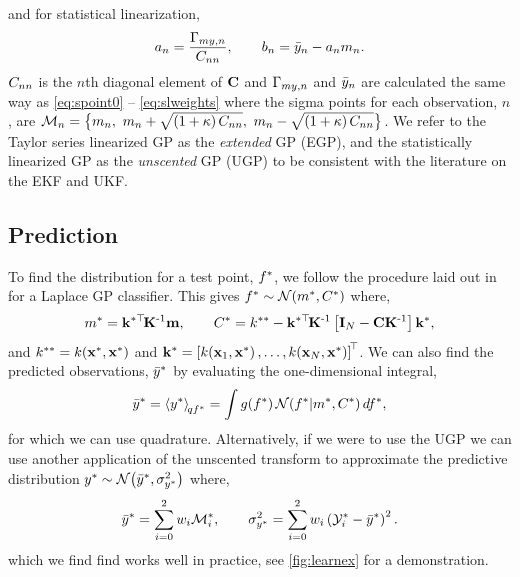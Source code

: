 \documentclass{article} %
\begin{document}
and for statistical linearization,
\begin{equation}
    a_n = \frac{\Gamma_{my,n}}{C_{nn}},
    \qquad
    b_n = \bar{y}_n - a_nm_n.
\end{equation}
$C_{nn}$ is the $n$th diagonal element of $\mathbf{C}$ and
$\Gamma_{my,n}$ and $\bar{y}_n$ are calculated the same way as
\eqref{eq:spoint0} -- \eqref{eq:slweights} where the sigma points for each
observation, $n$, are $\mathcal{M}_{n} = \big\{m_n,~m_n +
\sqrt{\left({1 + \kappa}\right)C_{nn}},~m_n - \sqrt{\left({1 +
        \kappa}\right)C_{nn}}\big\}$. We refer to the Taylor series linearized
GP as the \emph{extended} GP (EGP), and the statistically linearized GP as the
\emph{unscented} GP (UGP) to be consistent with the literature on the EKF and
UKF.


\subsection{Prediction}

To find the distribution for a test point, $f^{*}$, we follow the
procedure laid out in \cite{Rasmussen2006} for a Laplace GP classifier. This
gives $f^{*} \sim \mathcal{N}\!\left({m^{*}, C^{*}}\right)$ where,
\begin{equation}
    m^{*} = \mathbf{k}^{*\top}\!\mathbf{K}^{\text{-}1}\mathbf{m},
    \qquad
    C^{*} = k^{**} - \mathbf{k}^{*\top}\!\mathbf{K}^{\text{-}1}\left[{\mathbf{I}_{N} -
        \mathbf{C}\mathbf{K}^{\text{-}1}}\right]\mathbf{k}^{*},
\end{equation}
and $k^{**} = k\!\left({\mathbf{x}^{*}, \mathbf{x}^{*}}\right)$ and $\mathbf{k}^{*}
= \left[{k\!\left({\mathbf{x}_1, \mathbf{x}^{*}}\right), \ldots, k\!\left({\mathbf{x}_N,
        \mathbf{x}^{*}}\right)}\right]^{\!\top}$. We can also find the predicted observations,
$\bar{y}^{*}$ by evaluating the one-dimensional integral,
\begin{equation}
    \bar{y}^{*} = \left\langle{\ensuremath{y}\ensuremath{^{*}}}\right\rangle_{\!{qf^{*}}} = \int
        g\!\left({{f^{*}}}\right) \mathcal{N}\!\left({f^{*}}\middle\vert{\ensuremath{m}\ensuremath{^{*}},
            \ensuremath{C}\ensuremath{^{*}}}\right) df^{*},
\end{equation}
for which we can use quadrature. Alternatively, if we were to use the UGP we
can use another application of the unscented transform to approximate the
predictive distribution $y^{*} \sim \mathcal{N}\!\left({\bar{y}^{*},
    \sigma^2_{y^{*}}}\right)$ where,
\begin{equation}
    \bar{y}^{*} = \sum^2_{i=0} w_i \mathcal{M}_i^{*}, \qquad 
    \sigma^2_{y^{*}} = \sum^2_{i=0} w_i \left({\mathcal{Y}_i^{*} -
        \bar{y}^{*}}\right)^2.
    \label{eq:slpred}
\end{equation}
which we find find works well in practice, see \autoref{fig:learnex} for a
demonstration.
\end{document}
